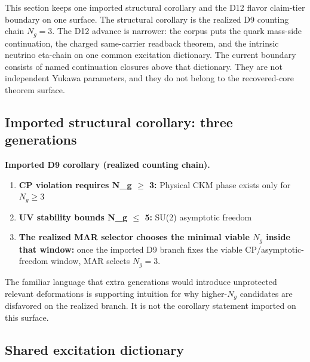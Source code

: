 This section keeps one imported structural corollary and the D12 flavor claim-tier boundary on one surface. The structural corollary is the realized D9 counting chain \(N_g=3\). The D12 advance is narrower: the corpus puts the quark mass-side continuation, the charged same-carrier readback theorem, and the intrinsic neutrino eta-chain on one common excitation dictionary. The current boundary consists of named continuation closures above that dictionary. They are not independent Yukawa parameters, and they do not belong to the recovered-core theorem surface.

\subsection{Imported structural corollary: three generations}\label{121-why-three-generations}

\textbf{Imported D9 corollary (realized counting chain).}

\begin{enumerate}
\def\labelenumi{\arabic{enumi}.}
\tightlist
\item
 \textbf{CP violation requires N\_g \ensuremath{\geq} 3:} Physical CKM phase exists only for \(N_g \geq 3\)
\item
 \textbf{UV stability bounds N\_g \ensuremath{\leq} 5:} SU(2) asymptotic freedom
\item
 \textbf{The realized MAR selector chooses the minimal viable \(N_g\) inside that window:} once the imported D9 branch fixes the viable CP/asymptotic-freedom window, MAR selects \(N_g=3\).
\end{enumerate}

The familiar language that extra generations would introduce unprotected relevant deformations is supporting intuition for why higher-\(N_g\) candidates are disfavored on the realized branch. It is not the corollary statement imported on this surface.

\subsection{Shared excitation dictionary}\label{122-yukawa-as-defect-mediated-overlap}

